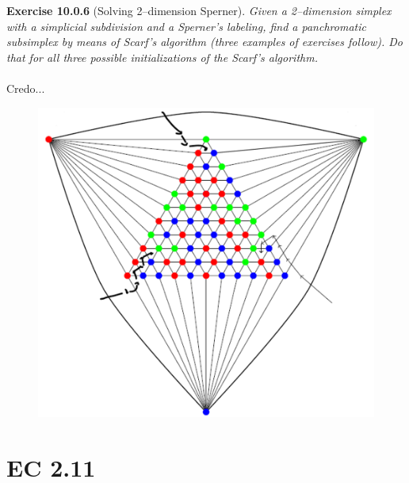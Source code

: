 \noindent
\textbf{Exercise 10.0.6} (Solving 2–dimension Sperner). \textit{Given a 2–dimension simplex with a simplicial subdivision and a Sperner’s labeling, find a panchromatic subsimplex by means of Scarf’s algorithm (three examples of exercises follow). Do that for all three possible initializations of the Scarf’s algorithm.}\\\\
Credo...
\begin{figure}[H]
\centering
\includegraphics[width=\textwidth]{images/img_2_10_03.png}
\end{figure}
\noindent
\section{EC 2.11}

